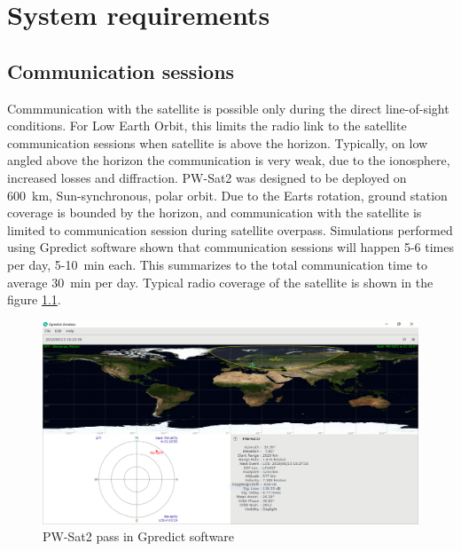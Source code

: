 \chapter{System requirements}
\section{Communication sessions}
Commmunication with the satellite is possible only during the direct line-of-sight conditions. For Low Earth Orbit, this limits the radio link to the satellite communication sessions when satellite is above the horizon. Typically, on low angled above the horizon the communication is very weak, due to the ionosphere, increased losses and diffraction.
PW-Sat2 was designed to be deployed on \SI{600}{\kilo\meter}, Sun-synchronous, polar orbit. Due to the Earts rotation, ground station coverage is bounded by the horizon, and communication with the satellite is limited to communication session during satellite overpass. Simulations performed using Gpredict software \cite{gpredict_website} shown that communication sessions will happen \si{5}-\si{6} times per day, \si{5}-\SI{10}{\minute} each. This summarizes to the total communication time to average \SI{30}{\minute} per day. Typical radio coverage of the satellite is shown in the figure \ref{gpredict_pass}.

\begin{figure}[h]
    \centering
    \includegraphics[width=0.8\paperwidth]{img/5/gpredict_pass.png}
    \caption{PW-Sat2 pass in Gpredict software}
    \label{gpredict_pass}
\end{figure}


